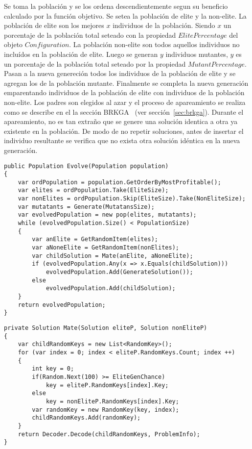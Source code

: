 Se toma la población y se los ordena descendientemente segun su beneficio calculado por la función objetivo. Se setea la población de elite y la non-elite. La población de elite son los mejores $x$ individuos de la población. Siendo $x$ un porcentaje de la población total seteado con la propiedad $ElitePercentage$ del objeto $Configuration$. La población non-elite son todos aquellos individuos no incluídos en la población de elite. Luego se generan $y$ individuos mutantes, $y$ es un porcentaje de la población total seteado por la propiedad $MutantPercentage$. Pasan a la nueva genereción todos los individuos de la población de elite y se agregan los de la población mutante. Finalmente se completa la nueva generación emparentando individuos de la población de elite con individuos de la población non-elite. Los padres son elegidos al azar y el proceso de apareamiento se realiza como se describe en el la sección BRKGA ~(ver sección~\ref{sec:brkga}). Durante el apareamiento, no es tan extraño que se genere una solución identica a otra ya existente en la población. De modo de no repetir soluciones, antes de insertar el individuo resultante se verifica que no exista otra solución idéntica en la nueva generación.

\bigskip

\begin{minipage}{\textwidth}
\begin{lstlisting}
public Population Evolve(Population population)
{
    var ordPopulation = population.GetOrderByMostProfitable();
    var elites = ordPopulation.Take(EliteSize);
    var nonElites = ordPopulation.Skip(EliteSize).Take(NonEliteSize);
    var mutatants = Generate(MutatansSize);
    var evolvedPopulation = new pop(elites, mutatants);
    while (evolvedPopulation.Size() < PopulationSize)
    {
		var anElite = GetRandomItem(elites);
		var aNoneElite = GetRandomItem(nonElites);
        var childSolution = Mate(anElite, aNoneElite);
        if (evolvedPopulation.Any(x => x.Equals(childSolution)))
            evolvedPopulation.Add(GenerateSolution());
        else
            evolvedPopulation.Add(childSolution);
    }
    return evolvedPopulation;
}
\end{lstlisting}
\end{minipage}

\begin{minipage}{\textwidth}
\begin{lstlisting}
private Solution Mate(Solution eliteP, Solution nonEliteP)
{
	var childRandomKeys = new List<RandomKey>();
	for (var index = 0; index < eliteP.RandomKeys.Count; index ++)
	{
		int key = 0;
		if(Random.Next(100) >= EliteGenChance)
			key = eliteP.RandomKeys[index].Key;
		else
			key = nonEliteP.RandomKeys[index].Key;
		var randomKey = new RandomKey(key, index);
		childRandomKeys.Add(randomKey);
	}
	return Decoder.Decode(childRandomKeys, ProblemInfo);
}
\end{lstlisting}
\end{minipage}

